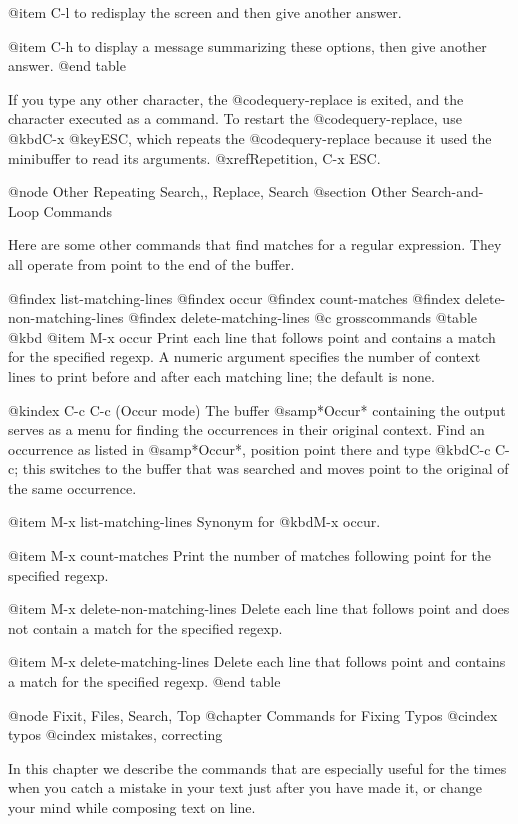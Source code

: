 {{{{{{{{{{{{{{{{{{{{@item C-l
to redisplay the screen and then give another answer.

@item C-h
to display a message summarizing these options, then give another
answer.
@end table

  If you type any other character, the @code{query-replace} is exited, and
the character executed as a command.  To restart the @code{query-replace},
use @kbd{C-x @key{ESC}}, which repeats the @code{query-replace} because it
used the minibuffer to read its arguments.  @xref{Repetition, C-x ESC}.

@node Other Repeating Search,, Replace, Search
@section Other Search-and-Loop Commands

  Here are some other commands that find matches for a regular expression.
They all operate from point to the end of the buffer.

@findex list-matching-lines
@findex occur
@findex count-matches
@findex delete-non-matching-lines
@findex delete-matching-lines
@c grosscommands
@table @kbd
@item M-x occur
Print each line that follows point and contains a match for the
specified regexp.  A numeric argument specifies the number of context
lines to print before and after each matching line; the default is
none.

@kindex C-c C-c (Occur mode)
The buffer @samp{*Occur*} containing the output serves as a menu for
finding the occurrences in their original context.  Find an occurrence
as listed in @samp{*Occur*}, position point there and type @kbd{C-c
C-c}; this switches to the buffer that was searched and moves point to
the original of the same occurrence.

@item M-x list-matching-lines
Synonym for @kbd{M-x occur}.

@item M-x count-matches
Print the number of matches following point for the specified regexp.

@item M-x delete-non-matching-lines
Delete each line that follows point and does not contain a match for
the specified regexp.

@item M-x delete-matching-lines
Delete each line that follows point and contains a match for the
specified regexp.
@end table

@node Fixit, Files, Search, Top
@chapter Commands for Fixing Typos
@cindex typos
@cindex mistakes, correcting

  In this chapter we describe the commands that are especially useful for
the times when you catch a mistake in your text just after you have made
it, or change your mind while composing text on line.

}}}}}}}}}}}}}}}}}}}}
